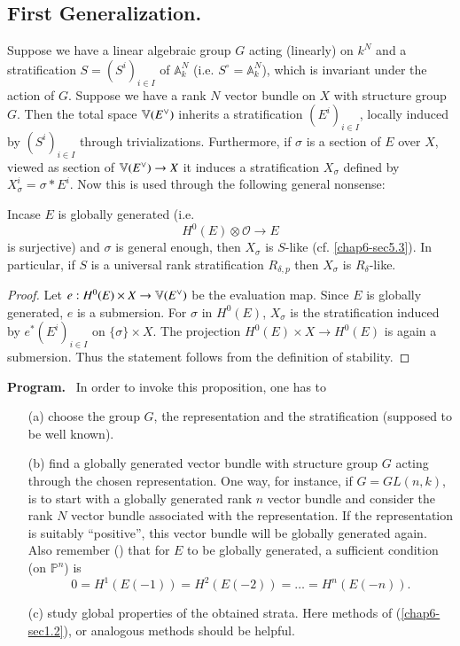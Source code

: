 \subsection{First Generalization.}\label{chap6-sec6.2}

Suppose we have a linear algebraic group $G$ acting (linearly) on
$k^{N}$ and a stratification $S=(S^{i})_{i\in I}$ of
$\mathbb{A}^{N}_{k}$ (i.e. $S^{\circ}=\mathbb{A}^{N}_{k}$), which is
invariant under the action of $G$. Suppose we have a rank $N$ vector
bundle on $X$ with structure group $G$. Then the total space
$\mathbb{V}(E\spcheck)$ inherits a stratification $(E^{i})_{i\in I}$,
locally induced by $(S^{i})_{i\in I}$ through
trivializations. Furthermore, if $\sigma$ is a section of $E$ over
$X$, viewed as section of $\mathbb{V}(E\spcheck)\to X$ it induces a
stratification $X_{\sigma}$ defined by $X^{i}_{\sigma}=\sigma\ast
E^{i}$. Now this is used through the following general nonsense: 

\begin{prop*}
In\pageoriginale case $E$ is globally generated (i.e.~
$$
H^{0}(E)\otimes \mathscr{O}\to E
$$ 
is surjective) and $\sigma$ is
general enough, then $X_{\sigma}$ is $S$-like {\rm
(cf. \ref{chap6-sec5.3})}. In particular, if $S$ is a universal rank
stratification $R_{\delta,p}$ then $X_{\sigma}$ is $R_{\delta}$-like. 
\end{prop*}

\begin{proof}
Let $e:H^{0}(E)\times X\to \mathbb{V}(E\spcheck)$ be the evaluation
map. Since $E$ is globally generated, $e$ is a submersion. For
$\sigma$ in $H^{0}(E)$, $X_{\sigma}$ is the stratification induced by
$e^{*}(E^{i})_{i\in I}$ on $\{\sigma\}\times X$. The projection
$H^{0}(E)\times X\to H^{0}(E)$ is again a submersion. Thus the
statement follows from the definition of stability.
\end{proof}

\noindent
{\bf Program.}~
In order to invoke this proposition, one has to
\begin{itemize}
\item[(a)] choose the group $G$, the representation and the
stratification (supposed to be well known).

\item[(b)] find a globally generated vector bundle with structure
group $G$ acting through the chosen representation. One way, for
instance, if $G=GL(n,k)$, is to start with a globally generated rank
$n$ vector bundle and consider the rank $N$ vector bundle associated
with the representation. If the representation is suitably
``positive'', this vector bundle will be globally generated
again. Also remember (\cite[p.~99]{chap6-Mum}) that for $E$ to be
globally generated, a sufficient condition (on $\mathbb{P}^{n}$) is 
$$
0=H^{1}(E(-1))=H^{2}(E(-2))=\ldots=H^{n}(E(-n)).
$$

\item[(c)] study global properties of the obtained strata. Here
methods of (\ref{chap6-sec1.2}), or analogous methods should be helpful.
\end{itemize}


